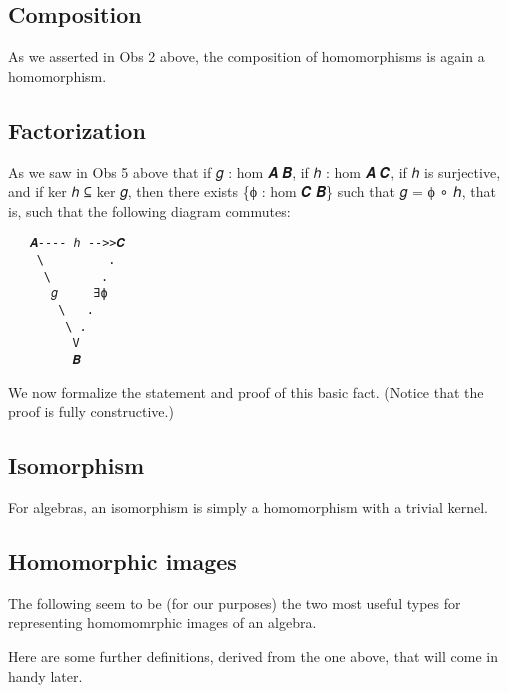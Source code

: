 \documentclass[sigplan,screen]{acmart}
\begin{document}
\subsection{Composition}\label{composition}
As we asserted in Obs 2 above, the composition of homomorphisms is again a homomorphism.
\begin{code}\end{code}

\subsection{Factorization}\label{factorization}
As we saw in Obs 5 above that if 𝑔 : hom 𝑨 𝑩, if ℎ : hom 𝑨 𝑪, if ℎ is surjective, and if ker ℎ ⊆ ker 𝑔, then there exists \{ϕ : hom 𝑪 𝑩\} such that 𝑔 = ϕ ∘ ℎ, that is, such that the following diagram commutes:

\begin{verbatim}
   𝑨---- ℎ -->>𝑪
    \         .
     \       .
      𝑔     ∃ϕ
       \   .
        \ .
         V
         𝑩
\end{verbatim}
We now formalize the statement and proof of this basic fact. (Notice that the proof is fully constructive.)
\begin{code}\end{code}

\subsection{Isomorphism}\label{isomorphism}
For algebras, an isomorphism is simply a homomorphism with a trivial kernel.
\begin{code}\end{code}

\subsection{Homomorphic images}\label{homomorphic-images}
The following seem to be (for our purposes) the two most useful types for representing homomomrphic images of an algebra.
\begin{code}\end{code}

Here are some further definitions, derived from the one above, that will come in handy later.
\begin{code}\end{code}
\end{document}
